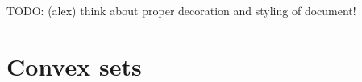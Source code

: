 \documentclass[a4paper, 12pt]{article}
\begin{document}
	
TODO: (alex) think about proper decoration and styling of document!

\section{Convex sets}

\end{document}
